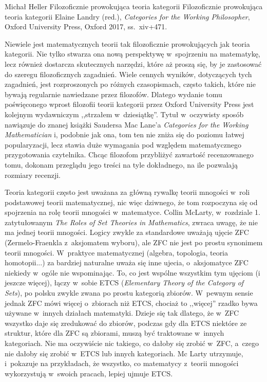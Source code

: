 \begin{recplenv}{Michał Heller}
	{Filozoficznie prowokująca teoria kategorii}
	{Filozoficznie prowokująca teoria kategorii}
	{Elaine Landry (red.), \textit{Categories for the Working Philosopher}, Oxford University Press, Oxford 2017, ss.~xiv+471.}







Niewiele jest matematycznych teorii tak filozoficznie prowokujących jak teoria kategorii. Nie tylko stwarza ona nową perspektywę w~spojrzeniu na matematykę, lecz również dostarcza skutecznych narzędzi, które aż proszą się, by je zastosować do szeregu filozoficznych zagadnień. Wiele cennych wyników, dotyczących tych zagadnień, jest rozproszonych po różnych czasopismach, często takich, które nie bywają regularnie nawiedzane przez filozofów. Dlatego wydanie tomu poświęconego wprost filozofii teorii kategorii przez Oxford University Press jest kolejnym wydawniczym ,,strzałem w~dziesiątkę''. Tytuł w~oczywisty sposób nawiązuje do znanej książki Saudersa Mac Lane'a \textit{Categories for the Working Mathematician} i, podobnie jak ona, tom ten nie zniża się do poziomu łatwej popularyzacji, lecz stawia duże wymagania pod względem matematycznego przygotowania czytelnika. Chcąc filozofom przybliżyć zawartość recenzowanego tomu, dokonam przeglądu jego treści na tyle dokładnego, na ile pozwalają rozmiary recenzji.

Teoria kategorii często jest uważana za główną rywalkę teorii mnogości w~roli podstawowej teorii matematycznej, nic więc dziwnego, że tom rozpoczyna się od spojrzenia na rolę teorii mnogości w~matematyce. Collin McLarty, w~rozdziale 1. zatytułowanym \textit{The Roles of Set Theories in Mathematics}, zwraca uwagę, że nie ma jednej teorii mnogości. Logicy zwykle za standardowe uważają ujęcie ZFC (Zermelo-Fraenkla z~aksjomatem wyboru), ale ZFC nie jest po prostu synonimem teorii mnogości. W~praktyce matematycznej (algebra, topologia, teoria homotopii...) za bardziej naturalne uważa się inne ujecia, o~aksjomatyce ZFC niekiedy w~ogóle nie wspominając. To, co jest wspólne wszystkim tym ujęciom (i jeszcze więcej), łączy w~sobie ETCS (\textit{Elementary Theory of the Category of Sets}), po polsku zwykle zwana po prostu kategorią zbiorów. W~pewnym sensie jednak ZFC mówi więcej o~zbiorach niż ETCS, chociaż to ,,więcej'' rzadko bywa używane w~innych działach matematyki. Dzieje się tak dlatego, że w~ZFC wszystko daje się zredukować do zbiorów, podczas gdy dla ETCS niektóre ze struktur, które dla ZFC są zbiorami, muszą być traktowane w~innych kategoriach. Nie ma oczywiście nic takiego, co dałoby się zrobić w~ZFC, a~czego nie dałoby się zrobić w~ETCS lub innych kategoriach. Mc Larty utrzymuje, i~pokazuje na przykładach, że wszystko, co matematycy z~teorii mnogości wykorzystują w~swoich pracach, lepiej ujmuje ETCS.


\end{recplenv}
